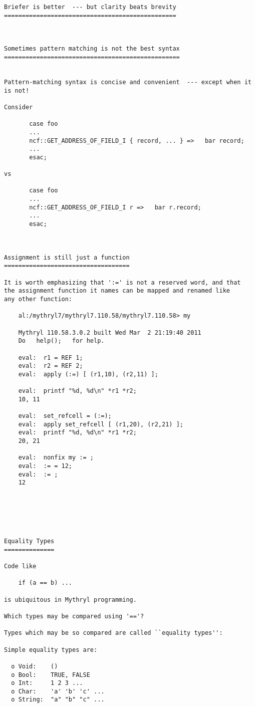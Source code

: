 \begin{verbatim}
Briefer is better  --- but clarity beats brevity 
================================================ 



Sometimes pattern matching is not the best syntax 
================================================= 


Pattern-matching syntax is concise and convenient  --- except when it is not! 

Consider 

       case foo 
	   ...  
	   ncf::GET_ADDRESS_OF_FIELD_I { record, ... } =>   bar record; 
	   ...  
       esac; 

vs 

       case foo 
	   ...  
	   ncf::GET_ADDRESS_OF_FIELD_I r =>   bar r.record; 
	   ...  
       esac; 



Assignment is still just a function 
=================================== 

It is worth emphasizing that ':=' is not a reserved word, and that 
the assignment function it names can be mapped and renamed like 
any other function: 

    al:/mythryl7/mythryl7.110.58/mythryl7.110.58> my 

    Mythryl 110.58.3.0.2 built Wed Mar  2 21:19:40 2011 
    Do   help();   for help.

    eval:  r1 = REF 1; 
    eval:  r2 = REF 2; 
    eval:  apply (:=) [ (r1,10), (r2,11) ]; 

    eval:  printf "%d, %d\n" *r1 *r2; 
    10, 11 

    eval:  set_refcell = (:=); 
    eval:  apply set_refcell [ (r1,20), (r2,21) ]; 
    eval:  printf "%d, %d\n" *r1 *r2; 
    20, 21 

    eval:  nonfix my := ; 
    eval:  := = 12; 
    eval:  := ; 
    12 






Equality Types 
============== 

Code like 

    if (a == b) ... 

is ubiquitous in Mythryl programming. 

Which types may be compared using '=='? 

Types which may be so compared are called ``equality types'': 

Simple equality types are: 

  o Void:    () 
  o Bool:    TRUE, FALSE 
  o Int:     1 2 3 ... 
  o Char:    'a' 'b' 'c' ... 
  o String:  "a" "b" "c" ... 


\end{verbatim}
